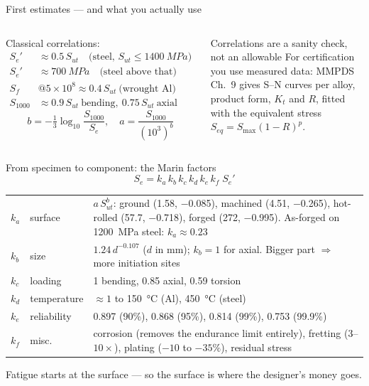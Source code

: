 \documentclass[aspectratio=169,10pt]{beamer}
\begin{document}
\begin{frame}{First estimates --- and what you actually use}
\begin{columns}[T]
Classical correlations:
\begin{align*}
S_e' &\approx 0.5\,S_{ut} \quad\text{(steel, } S_{ut}\le\SI{1400}{MPa})\\
S_e' &\approx \SI{700}{MPa} \quad\text{(steel above that)}\\
S_{f}&@5{\times}10^{8}\approx 0.4\,S_{ut}\ \text{(wrought Al)}\\
S_{1000}&\approx 0.9\,S_{ut}\ \text{bending},\ 0.75\,S_{ut}\ \text{axial}
\end{align*}
\[
b=-\tfrac13\log_{10}\!\frac{S_{1000}}{S_e},\quad a=\frac{S_{1000}}{(10^{3})^{b}}
\]
\begin{alertblock}{Correlations are a sanity check, not an allowable}
For certification you use \alert{measured} data: MMPDS Ch.\ 9 gives S--N curves per alloy, product form, $K_t$ and $R$, fitted with the equivalent stress $S_{eq}=S_{\max}(1-R)^{p}$.
\end{alertblock}
\end{columns}
\end{frame}

\begin{frame}{From specimen to component: the Marin factors}
\[
S_e=k_a\,k_b\,k_c\,k_d\,k_e\,k_f\;S_e'
\]
\footnotesize
\begin{tabular}{@{}llp{7.4cm}@{}}
\toprule
$k_a$ & surface & $a\,S_{ut}^{b}$: ground (1.58, $-$0.085), machined (4.51, $-$0.265), hot-rolled (57.7, $-$0.718), forged (272, $-$0.995). As-forged on \SI{1200}{MPa} steel: $k_a\approx0.23$ \\
$k_b$ & size & $1.24\,d^{-0.107}$ ($d$ in mm); $k_b=1$ for axial. Bigger part $\Rightarrow$ more initiation sites \\
$k_c$ & loading & 1 bending, 0.85 axial, 0.59 torsion \\
$k_d$ & temperature & $\approx1$ to \SI{150}{\celsius} (Al), \SI{450}{\celsius} (steel) \\
$k_e$ & reliability & 0.897 (90\%), 0.868 (95\%), 0.814 (99\%), 0.753 (99.9\%) \\
$k_f$ & misc. & corrosion (\alert{removes the endurance limit entirely}), fretting ($3$--$10\times$), plating ($-10$ to $-35\%$), residual stress \\
\bottomrule
\end{tabular}
\vspace{2pt}
\normalsize
\begin{block}{}
Fatigue starts at the surface --- so the surface is where the designer's money goes.
\end{block}
\end{frame}
\end{document}
